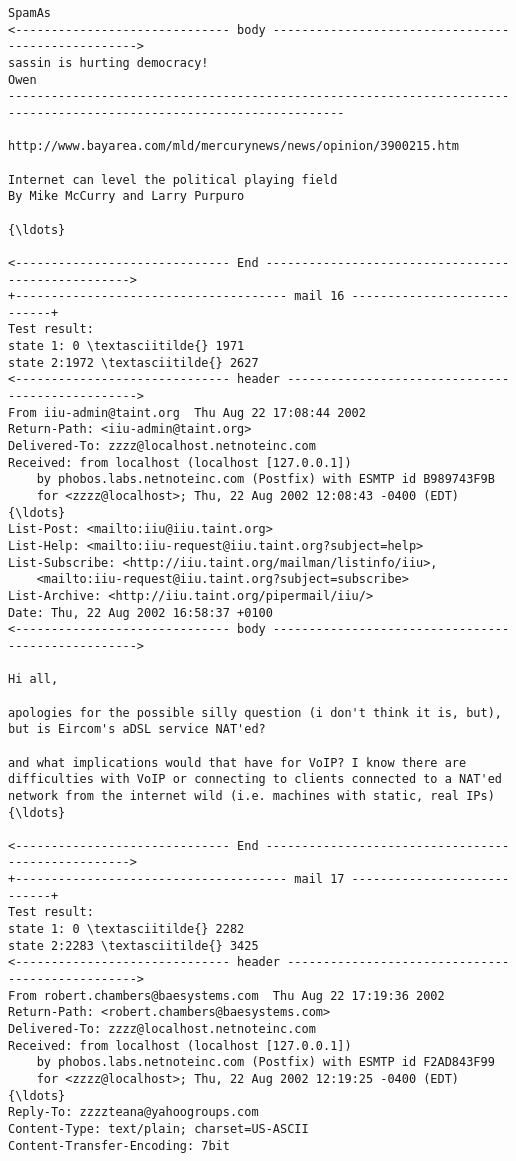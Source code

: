 \documentclass[11pt]{article}
\begin{document}
\begin{Verbatim}[commandchars=\\\{\}]
SpamAs
<------------------------------ body --------------------------------------------------->
sassin is hurting democracy!
Owen
---------------------------------------------------------------------------------------------------------------------

http://www.bayarea.com/mld/mercurynews/news/opinion/3900215.htm

Internet can level the political playing field
By Mike McCurry and Larry Purpuro

{\ldots}

<------------------------------ End --------------------------------------------------->
+-------------------------------------- mail 16 ----------------------------+
Test result:
state 1: 0 \textasciitilde{} 1971
state 2:1972 \textasciitilde{} 2627
<------------------------------ header ------------------------------------------------->
From iiu-admin@taint.org  Thu Aug 22 17:08:44 2002
Return-Path: <iiu-admin@taint.org>
Delivered-To: zzzz@localhost.netnoteinc.com
Received: from localhost (localhost [127.0.0.1])
	by phobos.labs.netnoteinc.com (Postfix) with ESMTP id B989743F9B
	for <zzzz@localhost>; Thu, 22 Aug 2002 12:08:43 -0400 (EDT)
{\ldots}
List-Post: <mailto:iiu@iiu.taint.org>
List-Help: <mailto:iiu-request@iiu.taint.org?subject=help>
List-Subscribe: <http://iiu.taint.org/mailman/listinfo/iiu>,
    <mailto:iiu-request@iiu.taint.org?subject=subscribe>
List-Archive: <http://iiu.taint.org/pipermail/iiu/>
Date: Thu, 22 Aug 2002 16:58:37 +0100
<------------------------------ body --------------------------------------------------->

Hi all,

apologies for the possible silly question (i don't think it is, but), 
but is Eircom's aDSL service NAT'ed?

and what implications would that have for VoIP? I know there are 
difficulties with VoIP or connecting to clients connected to a NAT'ed 
network from the internet wild (i.e. machines with static, real IPs)
{\ldots}

<------------------------------ End --------------------------------------------------->
+-------------------------------------- mail 17 ----------------------------+
Test result:
state 1: 0 \textasciitilde{} 2282
state 2:2283 \textasciitilde{} 3425
<------------------------------ header ------------------------------------------------->
From robert.chambers@baesystems.com  Thu Aug 22 17:19:36 2002
Return-Path: <robert.chambers@baesystems.com>
Delivered-To: zzzz@localhost.netnoteinc.com
Received: from localhost (localhost [127.0.0.1])
	by phobos.labs.netnoteinc.com (Postfix) with ESMTP id F2AD843F99
	for <zzzz@localhost>; Thu, 22 Aug 2002 12:19:25 -0400 (EDT)
{\ldots}
Reply-To: zzzzteana@yahoogroups.com
Content-Type: text/plain; charset=US-ASCII
Content-Transfer-Encoding: 7bit


\end{Verbatim}
\end{document}
